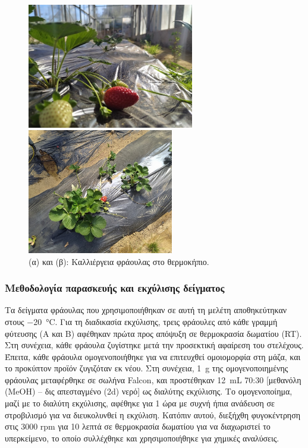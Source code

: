 \documentclass[12pt, a4paper]{report} %
\newcommand{\english}{\foreignlanguage{english}}
\begin{document}
\begin{figure}[H]
    \begin{minipage}[c]{.5\textwidth}
\centering
      \includegraphics[width=0.9\linewidth,height=155pt]{str_cult_a.jpg}
      \caption*{\hspace{35pt}(α)}{}
    \end{minipage}%
    \begin{minipage}[c]{0.5\textwidth}
\centering
      \includegraphics[width=0.9\linewidth,height=155pt]{str_cult_b.jpg}
      \caption*{\hspace{35pt}(β)}{}
    \end{minipage}
\caption{(α) και (β): Καλλιέργεια φράουλας στο θερμοκήπιο.}
\label{fig_str_cultivation}
\end{figure}

\subsubsection{Μεθοδολογία παρασκευής και εκχύλισης δείγματος}\label{subsub_str_extraction}

Τα δείγματα φράουλας που χρησιμοποιήθηκαν σε αυτή τη μελέτη αποθηκεύτηκαν στους \SI{-20}{\degreeCelsius}. Για τη 
διαδικασία εκχύλισης, τρεις φράουλες από κάθε γραμμή φύτευσης (Α και Β) αφέθηκαν πρώτα προς απόψυξη σε θερμοκρασία 
δωματίου (\english{RT}). Στη συνέχεια, κάθε φράουλα ζυγίστηκε μετά την προσεκτική αφαίρεση του στελέχους. Έπειτα, 
κάθε φράουλα ομογενοποιήθηκε για να επιτευχθεί ομοιομορφία στη μάζα, και το προκύπτον προϊόν ζυγιζόταν εκ νέου. Στη 
συνέχεια, \SI{1}{\gram} της ομογενοποιημένης φράουλας μεταφέρθηκε σε σωλήνα \english{Falcon}, και προστέθηκαν 
\SI{12}{\milli\liter} 70:30 [μεθανόλη (\english{MeOH}) – δις απεσταγμένο (\english{2d}) νερό] ως διαλύτης εκχύλισης. 
Το ομογενοποίημα, μαζί με το διαλύτη εκχύλισης, αφέθηκε για 1 ώρα με συχνή ήπια ανάδευση σε στροβιλισμό για να 
διευκολυνθεί η εκχύλιση. Κατόπιν αυτού, διεξήχθη φυγοκέντρηση στις 3000 rpm για 10 λεπτά σε θερμοκρασία δωματίου για 
να διαχωριστεί το υπερκείμενο, το οποίο συλλέχθηκε και χρησιμοποιήθηκε για χημικές αναλύσεις.
\end{document}
